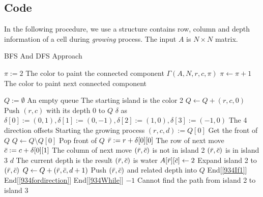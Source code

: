 \documentclass[a4paper,12pt]{article}
\begin{document}
\subsection{Code}
In the following procedure, we use a structure contains row, column and depth information of a cell during \textit{growing} process. The input $A$ is $N\times N$ matrix.
\setcounter{algorithm}{0}
\begin{algorithm}[H]
\caption{BFS And DFS Approach}
\begin{algorithmic}[1]
\State $\pi:=2$ \Comment The color to paint the connected component
\State $\Gamma(A, N, r, c, \pi)$
\State $\pi \gets \pi+1$ \Comment The color to paint next connected component
\EndIf
\EndFor
\EndFor
{}
\end{algorithmic}
\end{algorithm}
\begin{algorithm}[H]
\begin{algorithmic}[1]
\State $Q:=\emptyset$ \Comment An empty queue
 \Comment The starting island is the color 2
\State $Q \gets Q + (r, c, 0)$ \Comment Push $(r,c)$ with its depth 0 to $Q$
\EndIf
\EndFor
\EndFor
\State $\delta$ as $\delta[0]:=(0,1), \delta[1]:=(0,-1), \delta[2]:=(1,0), \delta[3]:=(-1,0)$ \Comment The 4 direction offsets
 \Comment Starting the growing process \label{934While}
\State $(r, c, d) := Q[0]$ \Comment Get the front of $Q$
\State $Q\gets Q\setminus Q[0]$  \Comment Pop front of $Q$
 \label{934fordirection}
\State $\Bar{r}:=r + \delta[0][0]$ \Comment The row of next move
\State $\Bar{c}:=c + \delta[0][1]$ \Comment The column of next move
 \Comment $(\Bar{r}, \Bar{c})$ is not in island 2 \label{934If1}
 \Comment $(\Bar{r}, \Bar{c})$ is in island 3
\State \Return $d$ \Comment The current depth is the result
\EndIf
{} \Comment $(\Bar{r}, \Bar{c})$ is water
\State $A[\Bar{r}][\Bar{c}]\gets 2$ \Comment Expand island 2 to $(\Bar{r}, \Bar{c})$
\State $Q\gets Q + (\Bar{r},\Bar{c},d+1)$ \Comment Push $(\Bar{r}, \Bar{c})$ and related depth into $Q$
\EndIf 
\EndIf \Comment End[\ref{934If1}]
\EndFor \Comment End[\ref{934fordirection}] 
\EndWhile \Comment End[\ref{934While}]
\State \Return $-1$ \Comment Cannot find the path from island 2 to island 3
\EndProcedure
\end{algorithmic}
\end{algorithm}
\end{document}
